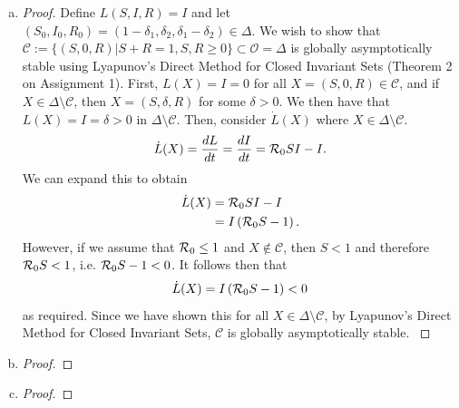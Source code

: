 \documentclass[12pt]{article}\usepackage[]{graphicx}\usepackage[]{color}
\begin{document}
\begin{enumerate}[(a)]
\item \SIRf
{\color{blue}\begin{proof}{\color{magenta}
Define $L(S, I, R) = I$ and let $(S_0, I_0, R_0) = (1- \delta_1, \delta_2, \delta_1 - \delta_2) \in \Delta$. We wish to show that $\mathcal{C} := \{(S, 0, R) | S+R = 1, S, R \geq 0\} \subset \mathcal{O} = \Delta$ is globally asymptotically stable using Lyapunov's Direct Method for Closed Invariant Sets (Theorem 2 on Assignment 1). 
First, $L(X) = I = 0$ for all $X = (S, 0, R) \in \mathcal{C}$, and if $X \in \Delta \setminus \mathcal{C}$, then $X = (S, \delta, R)$ for some $\delta >0$. We then have that $L(X) = I = \delta >0$ in $\Delta \setminus \mathcal{C}$. 
Then, consider $\dot{L}(X)$ where $X \in \Delta \setminus \mathcal{C}$.
\begin{equation}
\begin{aligned}
\dot L(X) = \frac{dL}{dt} = \frac{dI}{dt} = {\cal R}_0 S I - I.
\end{aligned}
\end{equation}
We can expand this to obtain 
\begin{equation}
\begin{aligned}
\dot L(X) &= {\cal R}_0 S I -  I \\
&= I \left( {\cal R}_0 S - 1 \right).
\end{aligned}
\end{equation}
However, if we assume that ${\cal R}_0 \leq 1$ and $X \not \in \mathcal{C}$, then $S < 1$ and therefore ${\cal R}_0 S <1$, i.e. ${\cal R}_0 S - 1 < 0$. It follows then that  
\begin{equation}
\begin{aligned}
\dot L(X) = I \left( {\cal R}_0 S - 1 \right) < 0
\end{aligned}
\end{equation}
as required. Since we have shown this for all $X \in \Delta \setminus \mathcal C$, by Lyapunov's Direct Method for Closed Invariant Sets, $\mathcal{C}$ is globally asymptotically stable.
}\end{proof}}

\item \SIRg
{\color{blue}\begin{proof}{\color{magenta}

}\end{proof}}

\item \SIRh
{\color{blue}\begin{proof}{\color{magenta}

}\end{proof}}


\end{enumerate}
\end{document}
